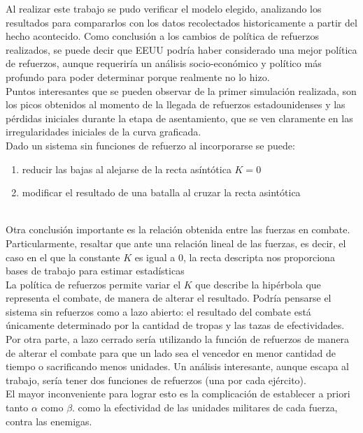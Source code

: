 \documentclass{sig-alternate}
\begin{document}
Al realizar este trabajo se pudo verificar el modelo elegido, analizando los resultados para compararlos con los datos recolectados historicamente
a partir del hecho acontecido. Como conclusión a los cambios de política de refuerzos realizados, se puede decir que EEUU podría haber considerado una
mejor política de refuerzos, aunque requeriría un análisis socio-económico y político más profundo para poder determinar porque realmente no
lo hizo.\\
Puntos interesantes que se pueden observar de la primer simulación realizada, son los picos obtenidos al momento de la llegada de refuerzos
estadounidenses y las pérdidas iniciales durante la etapa de asentamiento, que se ven claramente en las irregularidades iniciales de la curva 
graficada.\\
Dado un sistema sin funciones de refuerzo al incorporarse se puede:
\begin{enumerate}
\item reducir las bajas al alejarse de la recta asíntótica $K=0$
\item modificar el resultado de una batalla al cruzar la recta asintótica
\end{enumerate} \\
Otra conclusión importante es la relación obtenida entre las fuerzas en combate. Particularmente, resaltar que ante una relación lineal de las
fuerzas, es decir, el caso en el que la constante $K$ es igual a $0$, la recta descripta nos proporciona bases de trabajo para estimar estadísticas \\
La política de refuerzos permite variar el $K$ que describe la
hip\'erbola que representa el combate, de manera de alterar el
resultado. Podr\'ia pensarse el sistema sin refuerzos como a lazo
abierto: el resultado del combate está \'unicamente determinado
por la cantidad de tropas y las tazas de efectividades. Por otra
parte, a lazo cerrado ser\'ia utilizando la funci\'on de refuerzos de
manera de alterar el combate para que un lado sea el vencedor en menor
cantidad de tiempo o sacrificando menos unidades. Un análisis interesante, aunque escapa al trabajo, sería tener dos funciones de refuerzos (una por cada ejército). \\
El mayor inconveniente para lograr esto es la complicación de establecer a priori tanto $\alpha$ como $\beta$.
como la efectividad de las unidades militares de cada fuerza, contra las enemigas.
\end{document}
